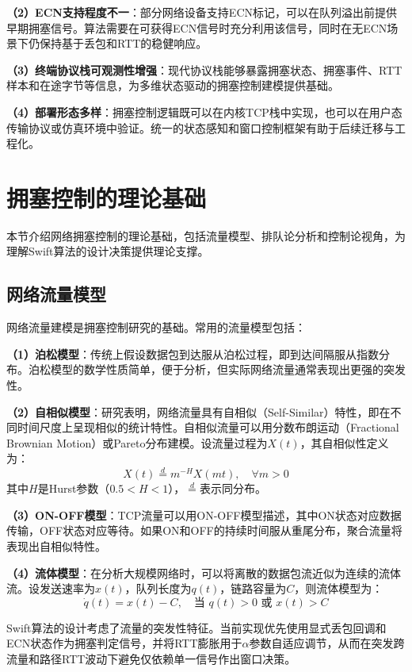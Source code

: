 \textbf{（2）ECN支持程度不一}：部分网络设备支持ECN标记，可以在队列溢出前提供早期拥塞信号。算法需要在可获得ECN信号时充分利用该信号，同时在无ECN场景下仍保持基于丢包和RTT的稳健响应。

\textbf{（3）终端协议栈可观测性增强}：现代协议栈能够暴露拥塞状态、拥塞事件、RTT样本和在途字节等信息，为多维状态驱动的拥塞控制建模提供基础。

\textbf{（4）部署形态多样}：拥塞控制逻辑既可以在内核TCP栈中实现，也可以在用户态传输协议或仿真环境中验证。统一的状态感知和窗口控制框架有助于后续迁移与工程化。

\section{拥塞控制的理论基础}

本节介绍网络拥塞控制的理论基础，包括流量模型、排队论分析和控制论视角，为理解Swift算法的设计决策提供理论支撑。

\subsection{网络流量模型}

网络流量建模是拥塞控制研究的基础。常用的流量模型包括：

\textbf{（1）泊松模型}：传统上假设数据包到达服从泊松过程，即到达间隔服从指数分布。泊松模型的数学性质简单，便于分析，但实际网络流量通常表现出更强的突发性。

\textbf{（2）自相似模型}：研究表明，网络流量具有自相似（Self-Similar）特性，即在不同时间尺度上呈现相似的统计特性。自相似流量可以用分数布朗运动（Fractional Brownian Motion）或Pareto分布建模。设流量过程为$X(t)$，其自相似性定义为：
\begin{equation}
X(t) \stackrel{d}{=} m^{-H} X(mt), \quad \forall m > 0
\end{equation}
其中$H$是Hurst参数（$0.5 < H < 1$），$\stackrel{d}{=}$表示同分布。

\textbf{（3）ON-OFF模型}：TCP流量可以用ON-OFF模型描述，其中ON状态对应数据传输，OFF状态对应等待。如果ON和OFF的持续时间服从重尾分布，聚合流量将表现出自相似特性。

\textbf{（4）流体模型}：在分析大规模网络时，可以将离散的数据包流近似为连续的流体流。设发送速率为$x(t)$，队列长度为$q(t)$，链路容量为$C$，则流体模型为：
\begin{equation}
\dot{q}(t) = x(t) - C, \quad \text{当 } q(t) > 0 \text{ 或 } x(t) > C
\end{equation}

Swift算法的设计考虑了流量的突发性特征。当前实现优先使用显式丢包回调和ECN状态作为拥塞判定信号，并将RTT膨胀用于$\alpha$参数自适应调节，从而在突发跨流量和路径RTT波动下避免仅依赖单一信号作出窗口决策。

